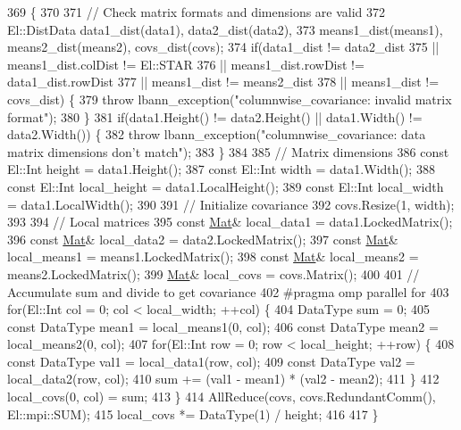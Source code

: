 \begin{DoxyCode}
369                                              \{
370 
371   \textcolor{comment}{// Check matrix formats and dimensions are valid}
372   El::DistData data1\_dist(data1), data2\_dist(data2),
373     means1\_dist(means1), means2\_dist(means2), covs\_dist(covs);
374   \textcolor{keywordflow}{if}(data1\_dist != data2\_dist
375      || means1\_dist.colDist != El::STAR
376      || means1\_dist.rowDist != data1\_dist.rowDist
377      || means1\_dist != means2\_dist
378      || means1\_dist != covs\_dist) \{
379     \textcolor{keywordflow}{throw} lbann\_exception(\textcolor{stringliteral}{"columnwise\_covariance: invalid matrix format"});
380   \}
381   \textcolor{keywordflow}{if}(data1.Height() != data2.Height() || data1.Width() != data2.Width()) \{
382     \textcolor{keywordflow}{throw} lbann\_exception(\textcolor{stringliteral}{"columnwise\_covariance: data matrix dimensions don't match"});
383   \}
384 
385   \textcolor{comment}{// Matrix dimensions}
386   \textcolor{keyword}{const} El::Int height = data1.Height();
387   \textcolor{keyword}{const} El::Int width = data1.Width();
388   \textcolor{keyword}{const} El::Int local\_height = data1.LocalHeight();
389   \textcolor{keyword}{const} El::Int local\_width = data1.LocalWidth();
390 
391   \textcolor{comment}{// Initialize covariance}
392   covs.Resize(1, width);
393 
394   \textcolor{comment}{// Local matrices}
395   \textcolor{keyword}{const} \hyperlink{base_8hpp_a68f11fdc31b62516cb310831bbe54d73}{Mat}& local\_data1 = data1.LockedMatrix();
396   \textcolor{keyword}{const} \hyperlink{base_8hpp_a68f11fdc31b62516cb310831bbe54d73}{Mat}& local\_data2 = data2.LockedMatrix();
397   \textcolor{keyword}{const} \hyperlink{base_8hpp_a68f11fdc31b62516cb310831bbe54d73}{Mat}& local\_means1 = means1.LockedMatrix();
398   \textcolor{keyword}{const} \hyperlink{base_8hpp_a68f11fdc31b62516cb310831bbe54d73}{Mat}& local\_means2 = means2.LockedMatrix();
399   \hyperlink{base_8hpp_a68f11fdc31b62516cb310831bbe54d73}{Mat}& local\_covs = covs.Matrix();
400 
401   \textcolor{comment}{// Accumulate sum and divide to get covariance}
402 \textcolor{preprocessor}{  #pragma omp parallel for}
403   \textcolor{keywordflow}{for}(El::Int col = 0; col < local\_width; ++col) \{
404     DataType sum = 0;
405     \textcolor{keyword}{const} DataType mean1 = local\_means1(0, col);
406     \textcolor{keyword}{const} DataType mean2 = local\_means2(0, col);
407     \textcolor{keywordflow}{for}(El::Int row = 0; row < local\_height; ++row) \{
408       \textcolor{keyword}{const} DataType val1 = local\_data1(row, col);
409       \textcolor{keyword}{const} DataType val2 = local\_data2(row, col);
410       sum += (val1 - mean1) * (val2 - mean2);
411     \}
412     local\_covs(0, col) = sum;
413   \}
414   AllReduce(covs, covs.RedundantComm(), El::mpi::SUM);
415   local\_covs *= DataType(1) / height;
416 
417 \}
\end{DoxyCode}

